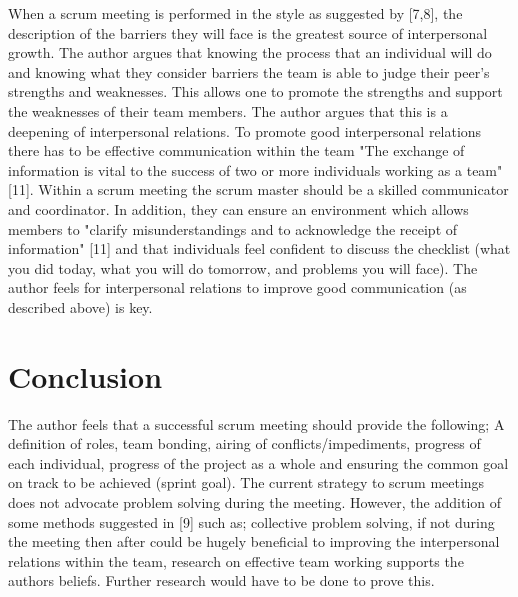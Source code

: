 \documentclass{scrartcl}
\begin{document}
When a scrum meeting is performed in the style as suggested by [7,8], the description of the barriers they will face is the greatest source of interpersonal growth. The author argues that knowing the process that an individual will do and knowing what they consider barriers the team is able to judge their peer’s strengths and weaknesses. This allows one to promote the strengths and support the weaknesses of their team members. The author argues that this is a deepening of interpersonal relations.
To promote good interpersonal relations there has to be effective communication within the team "The exchange of information is vital to the success of two or more individuals working as a team" [11]. Within a scrum meeting the scrum master should be a skilled communicator and coordinator. In addition, they can ensure an environment which allows members to "clarify misunderstandings and to acknowledge the receipt of information" [11] and that individuals feel confident to discuss the checklist (what you did today, what you will do tomorrow, and problems you will face). The author feels for interpersonal relations to improve good communication (as described above) is key. 


\section{Conclusion}

The author feels that a successful scrum meeting should provide the following; A definition of roles, team bonding, airing of conflicts/impediments, progress of each individual, progress of the project as a whole and ensuring the common goal on track to be achieved (sprint goal).  The current strategy to scrum meetings does not advocate problem solving during the meeting. However, the addition of some methods suggested in [9] such as; collective problem solving, if not during the meeting then after could be hugely beneficial to improving the interpersonal relations within the team, research on effective team working supports the authors beliefs. Further research would have to be done to prove this.



\end{document}
